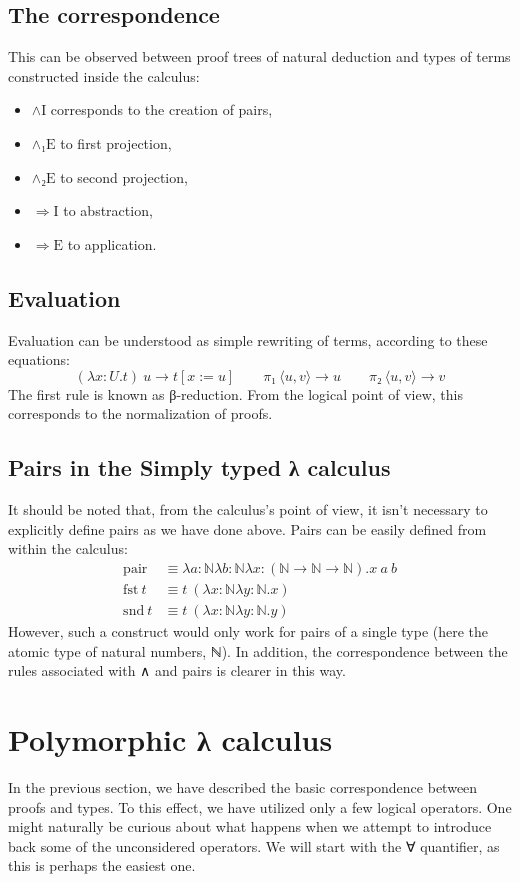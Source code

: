 \documentclass[12pt]{article}
\begin{document}
\subsection{The correspondence}
This can be observed between proof trees of natural deduction and types of terms constructed inside the calculus:
\begin{itemize}
    \item $\mathrm{∧I}$ corresponds to the creation of pairs,
    \item $\mathrm{∧₁E}$ to first projection,
    \item $\mathrm{∧₂E}$ to second projection,
    \item $\mathrm{⇒I}$ to abstraction,
    \item $\mathrm{⇒E}$ to application.
\end{itemize}
\subsection{Evaluation}
Evaluation can be understood as simple rewriting of terms, according to these equations:
\[(λx:U.t) \ u → t[x:=u] \qquad π₁ \ ⟨u,v⟩ → u \qquad π₂ \ ⟨u,v⟩ → v\]
The first rule is known as β-reduction. From the logical point of view, this corresponds to the normalization of proofs.
\subsection{Pairs in the Simply typed λ calculus}
\label{crappairs}
It should be noted that, from the calculus's point of view, it isn't necessary to explicitly define pairs as we have done above. Pairs can be easily defined from within the calculus:
\begin{align*}
    \mathrm{pair} &≡ λa:ℕλb:ℕλx:(ℕ → ℕ → ℕ).x \ a \ b\\
    \mathrm{fst} \ t &≡ t \ (λx:ℕλy:ℕ.x)\\
    \mathrm{snd} \ t &≡ t \ (λx:ℕλy:ℕ.y)
\end{align*}
However, such a construct would only work for pairs of a single type (here the atomic type of natural numbers, ℕ). In addition, the correspondence between the rules associated with ∧ and pairs is clearer in this way.

\section{Polymorphic λ calculus}
In the previous section, we have described the basic correspondence between proofs and types. To this effect, we have utilized only a few logical operators. One might naturally be curious about what happens when we attempt to introduce back some of the unconsidered operators. We will start with the ∀ quantifier, as this is perhaps the easiest one.
\iffalse{}
\end{document}
